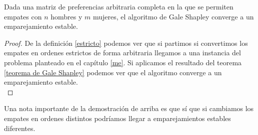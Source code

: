 \begin{cor}
Dada una matriz de preferencias arbitraria completa en la que se permiten empates con $n$ hombres y $m$ mujeres, el algoritmo de Gale Shapley converge a un emparejamiento estable.
\end{cor}
\begin{proof}
De la definición \ref{estricto} podemos ver que si partimos si convertimos los empates en ordenes estrictos de forma arbitraria llegamos a una instancia del problema planteado en el capítulo \ref{me}. Si aplicamos el resultado del teorema \ref{teorema de Gale Shapley} podemos ver que el algoritmo converge a un emparejamiento estable. \\
\end{proof}

Una nota importante de la demostración de arriba es que sí que si cambiamos los empates en ordenes distintos podríamos llegar a emparejamientos estables diferentes. 





